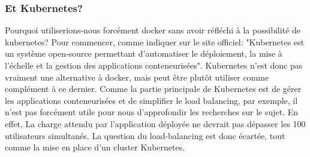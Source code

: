 \documentclass[
    iai, %
    il, %
]{heig-tb}
\begin{document}


\subsubsection{Et Kubernetes?}
Pourquoi utiliserions-nous forcément docker sans avoir réfléchi à la possibilité de \Gls{kubernetes}?
Pour commencer, comme indiquer sur le site officiel:
"Kubernetes est un système open-source permettant d'automatiser le déploiement, la mise à l'échelle et la gestion des applications conteneurisées".\newline
Kubernetes n'est donc pas vraiment une alternative à docker, mais peut être plutôt utiliser comme complément à ce dernier.\newline
Comme la partie principale de Kubernetes est de gérer les applications conteneurisées et de simplifier le load balancing, par exemple, il n'est pas forcément utile pour nous d'approfondir les recherches sur le sujet.\newline
En effet, La charge attendu par l'application déployée ne devrait pas dépasser les 100 utilisateurs simultanés. La question du load-balancing est donc écartée, tout comme la mise en place d'un cluster Kubernetes.



\end{document}
